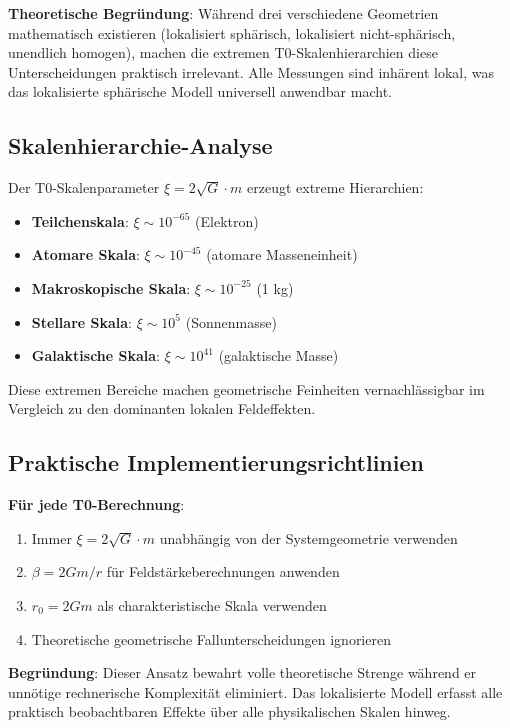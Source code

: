 \documentclass[12pt,a4paper]{article}
\begin{document}
	\textbf{Theoretische Begründung}: Während drei verschiedene Geometrien mathematisch existieren (lokalisiert sphärisch, lokalisiert nicht-sphärisch, unendlich homogen), machen die extremen T0-Skalenhierarchien diese Unterscheidungen praktisch irrelevant. Alle Messungen sind inhärent lokal, was das lokalisierte sphärische Modell universell anwendbar macht.
	
	\subsection{Skalenhierarchie-Analyse}
	\label{subsec:scale_hierarchy}
	
	Der T0-Skalenparameter $\xi = 2\sqrt{G} \cdot m$ erzeugt extreme Hierarchien:
	
	\begin{itemize}
		\item \textbf{Teilchenskala}: $\xi \sim 10^{-65}$ (Elektron)
		\item \textbf{Atomare Skala}: $\xi \sim 10^{-45}$ (atomare Masseneinheit)
		\item \textbf{Makroskopische Skala}: $\xi \sim 10^{-25}$ (1 kg)
		\item \textbf{Stellare Skala}: $\xi \sim 10^{5}$ (Sonnenmasse)
		\item \textbf{Galaktische Skala}: $\xi \sim 10^{41}$ (galaktische Masse)
	\end{itemize}
	
	Diese extremen Bereiche machen geometrische Feinheiten vernachlässigbar im Vergleich zu den dominanten lokalen Feldeffekten.
	
	\subsection{Praktische Implementierungsrichtlinien}
	\label{subsec:implementation_guidelines}
	
	\textbf{Für jede T0-Berechnung}:
	\begin{enumerate}
		\item Immer $\xi = 2\sqrt{G} \cdot m$ unabhängig von der Systemgeometrie verwenden
		\item $\beta = 2Gm/r$ für Feldstärkeberechnungen anwenden
		\item $r_0 = 2Gm$ als charakteristische Skala verwenden
		\item Theoretische geometrische Fallunterscheidungen ignorieren
	\end{enumerate}
	
	\textbf{Begründung}: Dieser Ansatz bewahrt volle theoretische Strenge während er unnötige rechnerische Komplexität eliminiert. Das lokalisierte Modell erfasst alle praktisch beobachtbaren Effekte über alle physikalischen Skalen hinweg.
	
\end{document}
